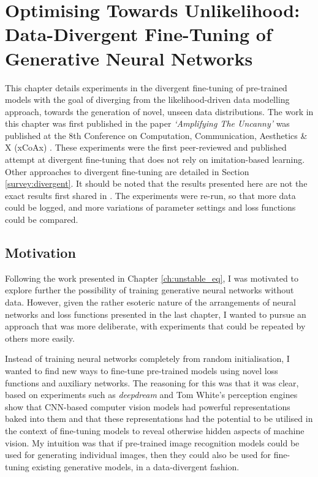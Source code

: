 \chapter{Optimising Towards Unlikelihood: Data-Divergent Fine-Tuning of Generative Neural Networks}
\label{ch:divergent}

This chapter details experiments in the divergent fine-tuning of pre-trained models with the goal of diverging from the likelihood-driven data modelling approach, towards the generation of novel, unseen data distributions.
The work in this chapter was first published in the paper \textit{`Amplifying The Uncanny'} was published at the 8th Conference on Computation, Communication, Aesthetics \& X (xCoAx) \citep{broad2020amplifying}. 
These experiments were the first peer-reviewed and published attempt at divergent fine-tuning that does not rely on imitation-based learning. 
Other approaches to divergent fine-tuning are detailed in Section \ref{survey:divergent}. 
It should be noted that the results presented here are not the exact results first shared in \cite{broad2020amplifying}. 
The experiments were re-run, so that more data could be logged, and more variations of parameter settings and loss functions could be compared.

\section{Motivation}
\label{c4:sec:motivation}

Following the work presented in Chapter \ref{ch:unstable_eq}, I was motivated to explore further the possibility of training generative neural networks without data. 
However, given the rather esoteric nature of the arrangements of neural networks and loss functions presented in the last chapter, I wanted to pursue an approach that was more deliberate, with experiments that could be repeated by others more easily. 

Instead of training neural networks completely from random initialisation, I wanted to find new ways to fine-tune pre-trained models using novel loss functions and auxiliary networks. 
The reasoning for this was that it was clear, based on experiments such as \textit{deepdream} \citep{mordvintsev2015inceptionism} and Tom White's perception engines \citep{white2018perception,white2019shared} show that CNN-based computer vision models had powerful representations baked into them and that these representations had the potential to be utilised in the context of fine-tuning models to reveal otherwise hidden aspects of machine vision.
My intuition was that if pre-trained image recognition models could be used for generating individual images, then they could also be used for fine-tuning existing generative models, in a data-divergent fashion.

